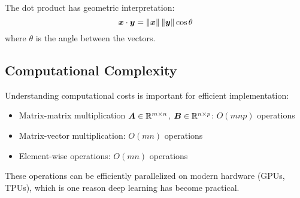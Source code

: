 The dot product has geometric interpretation:
\begin{equation}
    \boldsymbol{x} \cdot \boldsymbol{y} = \left\lVert\boldsymbol{x}\right\rVert \left\lVert\boldsymbol{y}\right\rVert \cos\theta
\end{equation}
where $\theta$ is the angle between the vectors.

\subsection{Computational Complexity}

Understanding computational costs is important for efficient implementation:

\begin{itemize}
    \item Matrix-matrix multiplication $\boldsymbol{A} \in \mathbb{R}^{m \times n}$, $\boldsymbol{B} \in \mathbb{R}^{n \times p}$: $O(mnp)$ operations
    \item Matrix-vector multiplication: $O(mn)$ operations
    \item Element-wise operations: $O(mn)$ operations
\end{itemize}

These operations can be efficiently parallelized on modern hardware (GPUs, TPUs), which is one reason deep learning has become practical.
